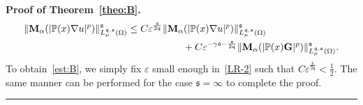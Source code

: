 \documentclass[a4paper, 11pt]{article}
\newenvironment{proof}[1][Proof]{\textbf{#1.} }{\hfill\rule{0.5em}{0.5em}}
\begin{document}
\begin{proof}[Proof of Theorem~\ref{theo:B}]
\begin{align}\notag
 \|\mathbf{M}_{\alpha}(|\mathbb{P}(x)\nabla u|^{p})\|_{L^{\mathfrak{q},\mathfrak{s}}_{\mu}(\Omega)}^{\mathfrak{s}} & \le C \varepsilon^{\frac{\mathfrak{s}}{2\mathfrak{q}}}  \|\mathbf{M}_{\alpha}(|\mathbb{P}(x)\nabla u|^{p})\|_{L^{\mathfrak{q},\mathfrak{s}}_{\mu}(\Omega)}^{\mathfrak{s}} \\
 & \hspace{2cm} + C \varepsilon^{-\gamma\mathfrak{s}-\frac{\mathfrak{s}}{2\mathfrak{q}}} \|\mathbf{M}_{\alpha}(|\mathbb{P}(x)\mathbf{G}|^{p})\|_{L^{\mathfrak{q},\mathfrak{s}}_{\mu}(\Omega)}^{\mathfrak{s}}.\label{LR-2}
\end{align}
To obtain~\eqref{est:B}, we simply fix $\varepsilon$ small enough in~\eqref{LR-2} such that $C \varepsilon^{\frac{\mathfrak{s}}{2\mathfrak{q}}}< \frac{1}{2}$. The same manner can be performed for the case $\mathfrak{s}=\infty$ to complete the proof.
\end{proof}
\end{document}

